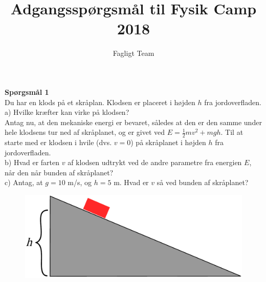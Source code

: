 \documentclass[a4paper,oneside,article]{memoir}
\begin{document}
\title{Adgangsspørgsmål til Fysik Camp 2018}

\author{Fagligt Team}

\maketitle

%
%
%

\textbf{Spørgsmål 1}\\
Du har en klods på et skråplan. Klodsen er placeret i højden $h$ fra jordoverfladen.\\

a) Hvilke kræfter kan virke på klodsen?\\

Antag nu, at den mekaniske energi er bevaret, således at den er den samme under hele klodsens tur ned af skråplanet, og er givet ved $E = \tfrac{1}{2} mv^2 + mgh$. Til at starte med er klodsen i hvile (dvs. $v=0$) på skråplanet i højden $h$ fra jordoverfladen.\\

b) Hvad er farten $v$ af klodsen udtrykt ved de andre parametre fra energien $E$, når den når bunden af skråplanet?\\

c) Antag, at $g = 10$ m/s, og $h = 5$ m. Hvad er $v$ så ved bunden af skråplanet?\\

\begin{figure}[h!]
	\centering
	\includegraphics[scale=0.6]{figur_ana.pdf}
\end{figure}
\end{document}
